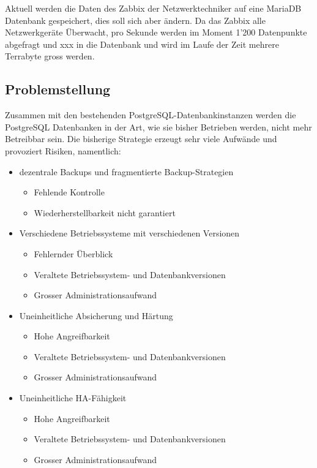 Aktuell werden die Daten des \Gls{Zabbix} der Netzwerktechniker auf eine \Gls{MariaDB} Datenbank gespeichert, dies soll sich aber ändern.
Da das \Gls{Zabbix} alle Netzwerkgeräte Überwacht, pro Sekunde werden im Moment 1'200 Datenpunkte abgefragt und xxx in die Datenbank und wird im Laufe der Zeit mehrere Terrabyte gross werden.
\subsection{Problemstellung}
Zusammen mit den bestehenden \Gls{PostgreSQL}-Datenbankinstanzen werden die \Gls{PostgreSQL} Datenbanken in der Art, wie sie bisher Betrieben werden, nicht mehr Betreibbar sein.
Die bisherige Strategie erzeugt sehr viele Aufwände und provoziert Risiken, namentlich:
\begin{itemize}
    \item dezentrale Backups und fragmentierte Backup-Strategien
    \begin{itemize}
        \item Fehlende Kontrolle
        \item Wiederherstellbarkeit nicht garantiert
    \end{itemize}
    \item Verschiedene Betriebssysteme mit verschiedenen Versionen
    \begin{itemize}
        \item Fehlernder Überblick
        \item Veraltete Betriebssystem- und Datenbankversionen
        \item Grosser Administrationsaufwand
    \end{itemize}
    \item Uneinheitliche Absicherung und Härtung
    \begin{itemize}
        \item Hohe Angreifbarkeit
        \item Veraltete Betriebssystem- und Datenbankversionen
        \item Grosser Administrationsaufwand
    \end{itemize}
    \item Uneinheitliche HA-Fähigkeit
    \begin{itemize}
        \item Hohe Angreifbarkeit
        \item Veraltete Betriebssystem- und Datenbankversionen
        \item Grosser Administrationsaufwand
    \end{itemize}
\end{itemize}

